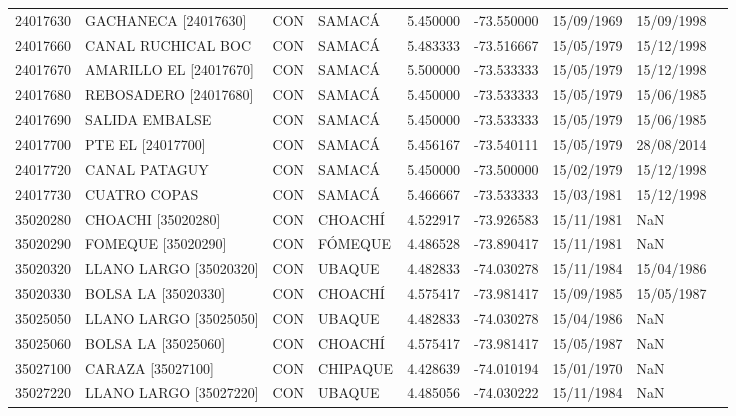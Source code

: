 \begin{landscape}
\begin{longtable}{lp{4cm}lp{3cm}lrrll}
   24017630 &        GACHANECA [24017630] &  CON &            SAMACÁ &  5.450000 & -73.550000 &  15/09/1969 &  15/09/1998 \\
   24017660 &          CANAL RUCHICAL BOC &  CON &            SAMACÁ &  5.483333 & -73.516667 &  15/05/1979 &  15/12/1998 \\
   24017670 &      AMARILLO EL [24017670] &  CON &            SAMACÁ &  5.500000 & -73.533333 &  15/05/1979 &  15/12/1998 \\
   24017680 &       REBOSADERO [24017680] &  CON &            SAMACÁ &  5.450000 & -73.533333 &  15/05/1979 &  15/06/1985 \\
   24017690 &              SALIDA EMBALSE &  CON &            SAMACÁ &  5.450000 & -73.533333 &  15/05/1979 &  15/06/1985 \\
   24017700 &           PTE EL [24017700] &  CON &            SAMACÁ &  5.456167 & -73.540111 &  15/05/1979 &  28/08/2014 \\
   24017720 &               CANAL PATAGUY &  CON &            SAMACÁ &  5.450000 & -73.500000 &  15/02/1979 &  15/12/1998 \\
   24017730 &                CUATRO COPAS &  CON &            SAMACÁ &  5.466667 & -73.533333 &  15/03/1981 &  15/12/1998 \\
   35020280 &          CHOACHI [35020280] &  CON &           CHOACHÍ &  4.522917 & -73.926583 &  15/11/1981 &         NaN \\
   35020290 &          FOMEQUE [35020290] &  CON &           FÓMEQUE &  4.486528 & -73.890417 &  15/11/1981 &         NaN \\
   35020320 &      LLANO LARGO [35020320] &  CON &            UBAQUE &  4.482833 & -74.030278 &  15/11/1984 &  15/04/1986 \\
   35020330 &         BOLSA LA [35020330] &  CON &           CHOACHÍ &  4.575417 & -73.981417 &  15/09/1985 &  15/05/1987 \\
   35025050 &      LLANO LARGO [35025050] &  CON &            UBAQUE &  4.482833 & -74.030278 &  15/04/1986 &         NaN \\
   35025060 &         BOLSA LA [35025060] &  CON &           CHOACHÍ &  4.575417 & -73.981417 &  15/05/1987 &         NaN \\
   35027100 &           CARAZA [35027100] &  CON &          CHIPAQUE &  4.428639 & -74.010194 &  15/01/1970 &         NaN \\
   35027220 &      LLANO LARGO [35027220] &  CON &            UBAQUE &  4.485056 & -74.030222 &  15/11/1984 &         NaN \\

\end{longtable}
\end{landscape}
